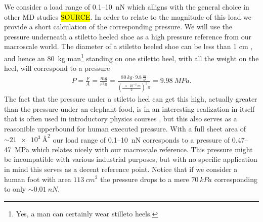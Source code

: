 We consider a load range of 0.1--\SI{10}{nN} which alligns with the general choice in other \acrshort{MD} studies \hl{SOURCE}. In order to relate to the magnitude of this load we provide a short calculation of the corresponding pressure. We will use the pressure underneath a stiletto heeled shoe as a high pressure reference from our macroscale world. The diameter of a stiletto heeled
shoe can be less than 1 cm \cite{stiletto_1}, and hence an \SI{80}{kg} man\footnote{Yes, a man can certainly
wear stilleto heels.} standing on one stiletto heel, with all the weight on the heel, will correspond to a pressure
\begin{align*}
  P = \frac{F}{A} = \frac{mg}{r^2\pi} = \frac{\SI{80}{kg} \cdot \SI{9.8}{\frac{m}{s^2}}}{(\frac{\SI{e-2}{m}}{2})^2 \pi} = \SI{9.98}{MPa}.
\end{align*} 
The fact that the pressure under a stiletto heel can get this high, actually greater than the pressure under an elephant food, is in an interesting realization in itself that is often used in
introductory physics courses \cite{stiletto_2}, but this also serves as a reasonible upperbound for human executed pressure. With
a full sheet area of $\sim\SI{21e3}{{\text{Å}}^2}$ our load range of 0.1--\SI{10}{nN} corresponds to a pressure of 0.47--\SI{47}{MPa} which relates nicely with our macroscale reference. This pressure might be incompatible with various industrial purposes, but with no specific application in mind this serves as a decent reference point. Notice that if we consider a human foot with area $\SI{113}{cm^2}$ \cite{stiletto_3} the pressure
drops to a mere $\SI{70}{kPa}$ corresponding to only $\sim \SI{0.01}{nN}$.





